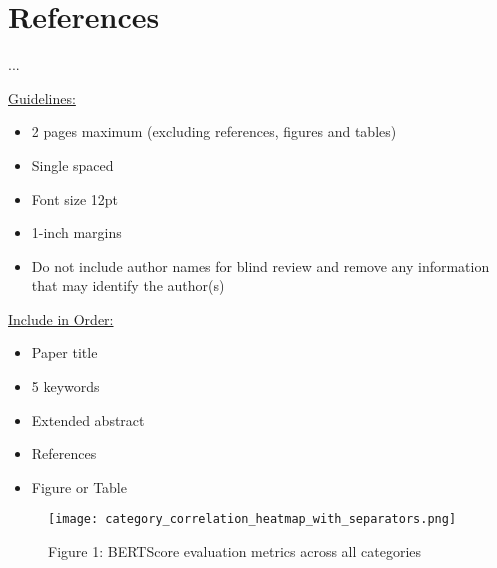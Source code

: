 \documentclass[a4paper,12pt]{article}
\begin{document}
\section*{References}
...

\vskip 40pt
\underline {Guidelines:}
\begin{itemize}
\itemsep0pt
  \item 2 pages maximum (excluding references, figures and tables)
  \item Single spaced
  \item Font size 12pt
  \item 1-inch margins
  \item Do not include author names for blind review and remove any information that may identify the author(s)
\end{itemize}

\underline {Include in Order:}
\begin{itemize}
\itemsep0pt
  \item Paper title
  \item 5 keywords
  \item Extended abstract 
  \item References
  \item Figure or Table
\end{itemize}

\newpage

\begin{figure}[htp]
\centering
\texttt{[image: category\_correlation\_heatmap\_with\_separators.png]}
\caption{Figure 1: BERTScore evaluation metrics across all categories}
\label{fig:image}
\end{figure}
\end{document}
